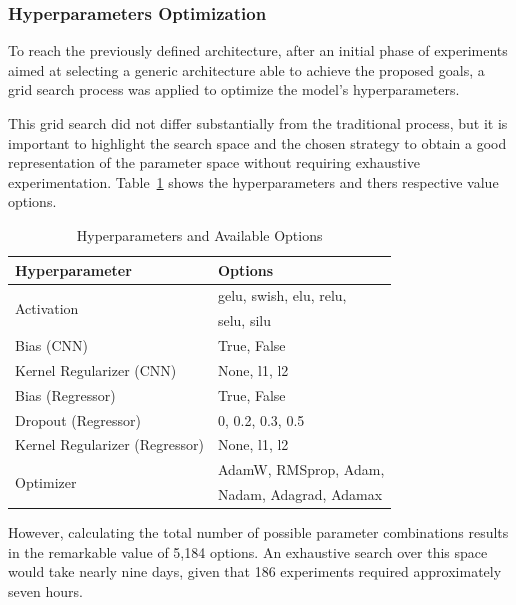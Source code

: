 \documentclass[10pt,conference]{IEEEtran}
\begin{document}
\subsubsection{Hyperparameters Optimization}

To reach the previously defined architecture, after an initial phase of experiments aimed at selecting a generic architecture able to achieve the proposed goals, a grid search process was applied to optimize the model’s hyperparameters.

This grid search did not differ substantially from the traditional process, but it is important to highlight the search space and the chosen strategy to obtain a good representation of the parameter space without requiring exhaustive experimentation. Table~\ref{tab:hyperparams_options} shows the hyperparameters and thers respective value options.


\begin{table} \small \centering
  \caption{Hyperparameters and Available Options}
  \label{tab:hyperparams_options}
\begin{tabular*}{\columnwidth}
    {@{\extracolsep{\fill}}ll}
    \toprule
    Hyperparameter & Options \\
    \midrule
    \multirow{2}{*}{Activation} & gelu, swish, elu, relu,  \\
    & selu, silu \\
    Bias (CNN) & True, False \\
    Kernel Regularizer (CNN) & None, l1, l2 \\
    Bias (Regressor) & True, False \\
    Dropout (Regressor) & 0, 0.2, 0.3, 0.5 \\
    Kernel Regularizer (Regressor) & None, l1, l2 \\
    \multirow{2}{*}{Optimizer} & AdamW, RMSprop, Adam, \\
    & Nadam, Adagrad, Adamax \\
    \bottomrule
  \end{tabular*}
\end{table}

However, calculating the total number of possible parameter combinations results in the remarkable value of 5,184 options. An exhaustive search over this space would take nearly nine days, given that 186 experiments required approximately seven hours.
\end{document}
